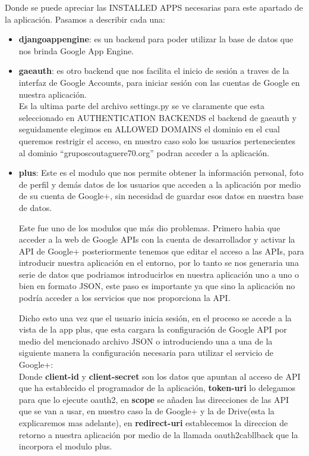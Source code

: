 Donde se puede apreciar las \textsc{INSTALLED APPS} necesarias para este apartado de la aplicación. Pasamos a describir cada una:\\
\begin{itemize}
\item \textbf{djangoappengine}: es un backend para poder utilizar la base de datos que nos brinda Google App Engine.\\

\item \textbf{gaeauth}: es otro backend que nos facilita el inicio de sesión a traves de la interfaz de Google Accounts, 
para iniciar sesión con las cuentas de Google en nuestra aplicación.\\

Es la ultima parte del archivo settings.py se ve claramente que esta seleccionado en \textsc{AUTHENTICATION BACKENDS} el backend de gaeauth y seguidamente elegimos en \textsc{ALLOWED DOMAINS} el dominio
en el cual queremos restrigir el acceso, en nuestro caso solo los usuarios pertenecientes al dominio ``gruposcoutaguere70.org'' podran acceder a la aplicación.

\item \textbf{plus}: Este es el modulo que nos permite obtener la información personal, foto de perfil y demás datos de los usuarios que acceden a la aplicación por medio de su cuenta de Google+, sin necesidad
de guardar esos datos en nuestra base de datos.

Este fue uno de los modulos que más dio problemas. Primero habia que acceder a la web de Google APIs con la cuenta de desarrollador y activar la API de Google+ posteriormente tenemos que editar el acceso a las APIs,
para introducir nuestra aplicación en el entorno, por lo tanto se nos generaria una serie de datos que podriamos introducirlos en nuestra aplicación uno a uno o bien en formato JSON, este paso es importante ya que sino la aplicación
no podría acceder a los servicios que nos proporciona la API.

Dicho esto una vez que el usuario inicia sesión, en el proceso se accede a la vista de la app plus, que esta cargara la configuración de Google API por medio del mencionado archivo JSON o introduciendo una a una 
de la siguiente manera la configuración necesaria para utilizar el servicio de Google+:\\



Donde \textbf{client-id} y \textbf{client-secret} son los datos que apuntan al acceso de API que ha establecido el programador de la aplicación, \textbf{token-uri} lo delegamos para que lo ejecute oauth2, en \textbf{scope}
se añaden las direcciones de las API que se van a usar, en nuestro caso la de Google+ y la de Drive(esta la explicaremos mas adelante), en \textbf{redirect-uri} establecemos la direccion de retorno a nuestra aplicación 
por medio de la llamada oauth2cabllback que la incorpora el modulo plus.


\end{itemize}
